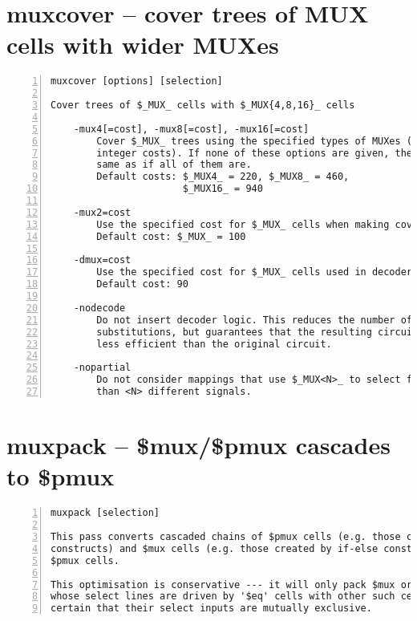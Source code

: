 \section{muxcover -- cover trees of MUX cells with wider MUXes}
\label{cmd:muxcover}
\begin{lstlisting}[numbers=left,frame=single]
    muxcover [options] [selection]

Cover trees of $_MUX_ cells with $_MUX{4,8,16}_ cells

    -mux4[=cost], -mux8[=cost], -mux16[=cost]
        Cover $_MUX_ trees using the specified types of MUXes (with optional
        integer costs). If none of these options are given, the effect is the
        same as if all of them are.
        Default costs: $_MUX4_ = 220, $_MUX8_ = 460, 
                       $_MUX16_ = 940

    -mux2=cost
        Use the specified cost for $_MUX_ cells when making covering decisions.
        Default cost: $_MUX_ = 100

    -dmux=cost
        Use the specified cost for $_MUX_ cells used in decoders.
        Default cost: 90

    -nodecode
        Do not insert decoder logic. This reduces the number of possible
        substitutions, but guarantees that the resulting circuit is not
        less efficient than the original circuit.

    -nopartial
        Do not consider mappings that use $_MUX<N>_ to select from less
        than <N> different signals.
\end{lstlisting}

\section{muxpack -- \$mux/\$pmux cascades to \$pmux}
\label{cmd:muxpack}
\begin{lstlisting}[numbers=left,frame=single]
    muxpack [selection]

This pass converts cascaded chains of $pmux cells (e.g. those create from case
constructs) and $mux cells (e.g. those created by if-else constructs) into
$pmux cells.

This optimisation is conservative --- it will only pack $mux or $pmux cells
whose select lines are driven by '$eq' cells with other such cells if it can be
certain that their select inputs are mutually exclusive.
\end{lstlisting}

